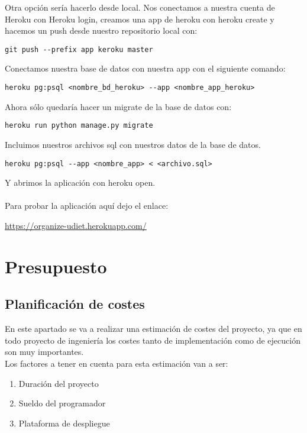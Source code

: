 Otra opción sería hacerlo desde local.
Nos conectamos a nuestra cuenta de Heroku con Heroku login, creamos una app de heroku con heroku create y hacemos un push desde nuestro repositorio local con:
\begin{lstlisting}
git push --prefix app keroku master
\end{lstlisting}

Conectamos nuestra base de datos con nuestra app con el siguiente comando:
\begin{lstlisting}
heroku pg:psql <nombre_bd_heroku> --app <nombre_app_heroku>
\end{lstlisting}

Ahora sólo quedaría hacer un migrate de la base de datos con:
\begin{lstlisting}
heroku run python manage.py migrate
\end{lstlisting}

Incluimos nuestros archivos sql con nuestros datos de la base de datos.
\begin{lstlisting}
heroku pg:psql --app <nombre_app> < <archivo.sql>
\end{lstlisting}
Y abrimos la aplicación con heroku open.\\\\

Para probar la aplicación aquí dejo el enlace:

\url{https://organize-udiet.herokuapp.com/}

\section{Presupuesto} \label{sec:coste}

\subsection{Planificación de costes}

En este apartado se va a realizar una estimación de costes del proyecto, ya que en todo proyecto de ingeniería los costes tanto de implementación como de ejecución son muy importantes.\\

Los factores a tener en cuenta para esta estimación van a ser:

\begin{enumerate}
  \item Duración del proyecto
  \item Sueldo del programador
  \item Plataforma de despliegue
\end{enumerate}

